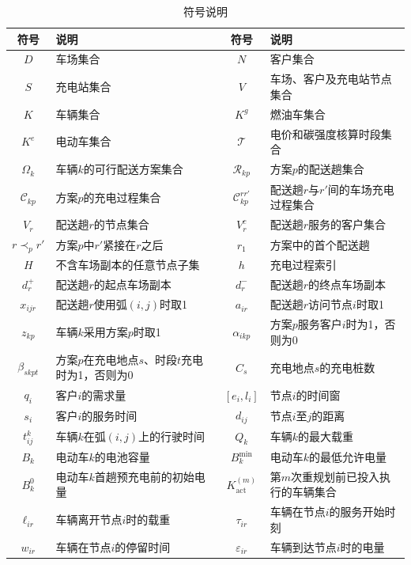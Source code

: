 \documentclass{setp-new}
\newcommand{\setpsymtabsetup}{\small\renewcommand{\arraystretch}{0.95}\setlength{\tabcolsep}{2.0pt}\hbadness=10000}
\begin{document}
\begin{table}[H]
\centering
\caption{符号说明}
\label{tab:unified-symbols}
\setpsymtabsetup
\begin{tabularx}{\linewidth}{@{}c>{\RaggedRight\arraybackslash}Xc>{\RaggedRight\arraybackslash}X@{}}
\toprule
符号 & 说明 & 符号 & 说明\\
\midrule
$D$ & 车场集合 & $N$ & 客户集合\\
$S$ & 充电站集合 & $V$ & 车场、客户及充电站节点集合\\
$K$ & 车辆集合 & $K^{g}$ & 燃油车集合\\
$K^{e}$ & 电动车集合 & $\mathcal T$ & 电价和碳强度核算时段集合\\
$\Omega_k$ & 车辆$k$的可行配送方案集合 & $\mathcal R_{kp}$ & 方案$p$的配送趟集合\\
$\mathcal C_{kp}$ & 方案$p$的充电过程集合 & $\mathcal C_{kp}^{rr'}$ & 配送趟$r$与$r'$间的车场充电过程集合\\
$V_r$ & 配送趟$r$的节点集合 & $V_r^{c}$ & 配送趟$r$服务的客户集合\\
$r\prec_p r'$ & 方案$p$中$r'$紧接在$r$之后 & $r_1$ & 方案中的首个配送趟\\
$H$ & 不含车场副本的任意节点子集 & $h$ & 充电过程索引\\
$d_r^{+}$ & 配送趟$r$的起点车场副本 & $d_r^{-}$ & 配送趟$r$的终点车场副本\\
$x_{ijr}$ & 配送趟$r$使用弧$(i,j)$时取1 & $a_{ir}$ & 配送趟$r$访问节点$i$时取1\\
$z_{kp}$ & 车辆$k$采用方案$p$时取1 & $\alpha_{ikp}$ & 方案$p$服务客户$i$时为1，否则为0\\
$\beta_{skpt}$ & 方案$p$在充电地点$s$、时段$t$充电时为1，否则为0 & $C_s$ & 充电地点$s$的充电桩数\\
$q_i$ & 客户$i$的需求量 & $[e_i,l_i]$ & 节点$i$的时间窗\\
$s_i$ & 客户$i$的服务时间 & $d_{ij}$ & 节点$i$至$j$的距离\\
$t_{ij}^{k}$ & 车辆$k$在弧$(i,j)$上的行驶时间 & $Q_k$ & 车辆$k$的最大载重\\
$B_k$ & 电动车$k$的电池容量 & $B_k^{\min}$ & 电动车$k$的最低允许电量\\
$B_k^{0}$ & 电动车$k$首趟预充电前的初始电量 & $K_{\mathrm{act}}^{(m)}$ & 第$m$次重规划前已投入执行的车辆集合\\
$\ell_{ir}$ & 车辆离开节点$i$时的载重 & $\tau_{ir}$ & 车辆在节点$i$的服务开始时刻\\
$w_{ir}$ & 车辆在节点$i$的停留时间 & $\varepsilon_{ir}$ & 车辆到达节点$i$时的电量\\

\end{tabularx}
\end{table}
\end{document}

